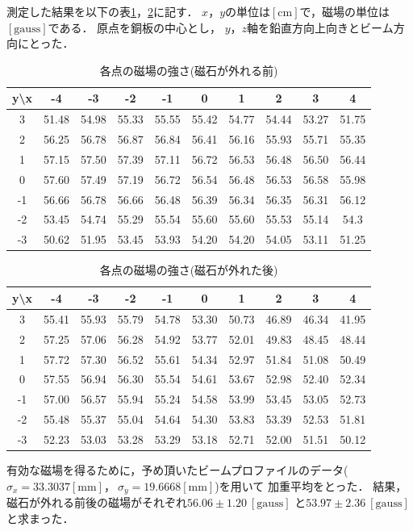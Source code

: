 測定した結果を以下の表\ref{MF1}，\ref{MF2}に記す．
$x，y$の単位は$[\mathrm{cm}]$で，磁場の単位は$[\mathrm{gauss}]$である．
原点を銅板の中心とし， $y，z$軸を鉛直方向上向きとビーム方向にとった．
\begin{table}[H]
  \begin{center}
    \caption{各点の磁場の強さ(磁石が外れる前)}\label{MF1}
    \begin{tabular}{|c||c|c|c|c|c|c|c|c|c|}\hline
       y\textbackslash x & -4 & -3 & -2 & -1 & 0 & 1 & 2 & 3 & 4 \\ \hline \hline
      3 & 51.48 & 54.98 & 55.33 & 55.55 & 55.42 & 54.77 & 54.44 & 53.27 & 51.75 \\ \hline
      2 & 56.25 & 56.78 & 56.87 & 56.84 & 56.41 & 56.16 & 55.93 & 55.71 & 55.35 \\ \hline
      1 & 57.15 & 57.50 & 57.39 & 57.11 & 56.72 & 56.53 & 56.48 & 56.50 & 56.44 \\ \hline
      0 & 57.60 & 57.49 & 57.19 & 56.72 & 56.54 & 56.48 & 56.53 & 56.58 & 55.98 \\ \hline
      -1 & 56.66 & 56.78 & 56.66 & 56.48 & 56.39 & 56.34 & 56.35 & 56.31 & 56.12 \\ \hline
      -2 & 53.45 & 54.74 & 55.29 & 55.54 & 55.60 & 55.60 & 55.53 & 55.14 & 54.3 \\ \hline
      -3 & 50.62 & 51.95 & 53.45 & 53.93 & 54.20 & 54.20 & 54.05 & 53.11 & 51.25 \\ \hline
    \end{tabular}
  \end{center}
\end{table}
\begin{table}[H]
  \begin{center}
    \caption{各点の磁場の強さ(磁石が外れた後)}\label{MF2}
    \begin{tabular}{|c||c|c|c|c|c|c|c|c|c|}\hline
       y\textbackslash x & -4 & -3 & -2 & -1 & 0 & 1 & 2 & 3 & 4 \\ \hline \hline
      3 & 55.41 & 55.93 & 55.79 & 54.78 & 53.30 & 50.73 & 46.89 & 46.34 & 41.95 \\ \hline
      2 & 57.25 & 57.06 & 56.28 & 54.92 & 53.77 & 52.01 & 49.83 & 48.45 & 48.44 \\ \hline
      1 & 57.72 & 57.30 & 56.52 & 55.61 & 54.34 & 52.97 & 51.84 & 51.08 & 50.49 \\ \hline
      0 & 57.55 & 56.94 & 56.30 & 55.54 & 54.61 & 53.67 & 52.98 & 52.40 & 52.34 \\ \hline
      -1 & 57.00 & 56.57 & 55.94 & 55.24 & 54.58 & 53.99 & 53.45 & 53.05 & 52.73 \\ \hline
      -2 & 55.48 & 55.37 & 55.04 & 54.64 & 54.30 & 53.83 & 53.39 & 52.53 & 51.81 \\ \hline
      -3 & 52.23 & 53.03 & 53.28 & 53.29 & 53.18 & 52.71 & 52.00 & 51.51 & 50.12 \\ \hline
 \end{tabular}
  \end{center}
\end{table}
有効な磁場を得るために，予め頂いたビームプロファイルのデータ($\sigma_x=33.3037[\mathrm{mm}]，\ \sigma_y=19.6668[\mathrm{mm}]$)を用いて
加重平均をとった．
結果，磁石が外れる前後の磁場がそれぞれ$56.06\pm 1.20\  [\mathrm{gauss}]$ と$53.97\pm 2.36\  [\mathrm{gauss}]$ と求まった．
\newpage
